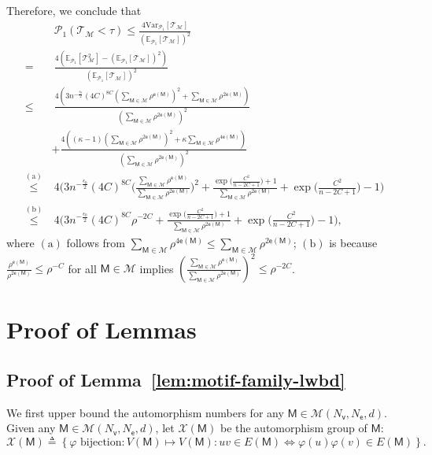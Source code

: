 \documentclass[letterpaper,11pt]{article}
\theoremstyle{definition}
\newcommand{\maM}{\mathcal{M}}
\newcommand{\maP}{\mathcal{P}}
\newcommand{\maT}{\mathcal{T}}
\newcommand{\maX}{\mathcal{X}}
\newcommand{\en}{\mathsf{{e}}}
\newcommand{\pth}[1]{\left( #1 \right)}
\newcommand{\qth}[1]{\left[ #1 \right]}
\newcommand{\sth}[1]{\left\{ #1 \right\}}
\newcommand{\sfM}{{\mathsf{M}}}
\newcommand{\sfe}{{\mathsf{e}}}
\newcommand{\sfv}{{\mathsf{v}}}
\def\var{\mathrm{Var}}
\def\E{\mathbb{E}}
\begin{document}
Therefore, we conclude that \begin{align*}
    &~\maP_1\pth{\maT_{\maM} <\tau }\le \frac{4\var_{\maP_1}\qth{\maT_{\maM}}}{\pth{\E_{\maP_1}\qth{\maT_{\maM}}}^2} \\=&~ \frac{4\pth{\E_{\maP_1}\qth{\maT_{\maM}^2}-\pth{\E_{\maP_1}\qth{\maT_{\maM}}}^2}}{\pth{\E_{\maP_1}\qth{\maT_{\maM}}}^2} \\
    \le&~ \frac{4\pth{3n^{-\frac{\epsilon_0}{2}} (4C)^{8C} \pth{\sum_{\sfM\in \maM} \rho^{\en(\sfM)}}^2+\sum_{\sfM\in\maM} \rho^{2\en(\sfM)}}}{\pth{\sum_{\sfM\in \maM} \rho^{2\en(\sfM)}}^2}\\&+\frac{4\pth{(\kappa-1) \pth{\sum_{\sfM\in \maM} \rho^{2\en(\sfM)}}^2+\kappa \sum_{\sfM\in \maM} \rho^{4\en(\sfM)}}}{\pth{\sum_{\sfM\in \maM} \rho^{2\en(\sfM)}}^2} \\
    \overset{\mathrm{(a)}}{\le}&~  4\Bigg(3n^{-\frac{\epsilon_0}{2}} (4C)^{8C} \Big(\frac{\sum_{\sfM\in \maM} \rho^{\en(\sfM)}}{\sum_{\sfM\in \maM} \rho^{2\en(\sfM)}}\Big)^2+\frac{\exp\big(\frac{C^2}{n-2C+1}\big)+1}{\sum_{\sfM\in \maM} \rho^{2\en(\sfM)}}+\exp\Big(\frac{C^2}{n-2C+1}\Big)-1\Bigg)\\
    \overset{\mathrm{(b)}}{\le}&~4\Bigg(3n^{-\frac{\epsilon_0}{2}} (4C)^{8C} \rho^{-2C}+\frac{\exp\big(\frac{C^2}{n-2C+1}\big)+1}{\sum_{\sfM\in \maM} \rho^{2\en(\sfM)}}+\exp\Big(\frac{C^2}{n-2C+1}\Big)-1\Bigg),
\end{align*}
where $\mathrm{(a)}$ follows from $\sum_{\sfM\in \maM} \rho^{4\en(\sfM)}\le \sum_{\sfM\in \maM} \rho^{2\en(\sfM)}$; $\mathrm{(b)}$ is because $\frac{\rho^{\en(\sfM)}}{\rho^{2\en(\sfM)}}\le \rho^{-C}$ for all $\sfM\in \maM$ implies $\pth{\frac{\sum_{\sfM\in \maM} \rho^{\en(\sfM)}}{\sum_{\sfM\in \maM} \rho^{2\en(\sfM)}}}^2\le \rho^{-2C}$.



\section{Proof of Lemmas}

\subsection{Proof of Lemma~\ref{lem:motif-family-lwbd}}\label{apd:proof-lem-motif-family-lwbd}

We first upper bound the automorphism numbers for any $\sfM\in \maM(N_\sfv,N_\sfe,d)$. Given any $\sfM\in \maM(N_\sfv,N_\sfe,d)$, let $\maX(\sfM)$ be the automorphism group of $\sfM$:
\[
\maX(\sfM)\triangleq \sth{\varphi\text{ bijection}:V(\sfM)\mapsto V(\sfM):uv\in E(\sfM)\iff \varphi(u)\varphi(v)\in E(\sfM)}.
\]
\end{document}
